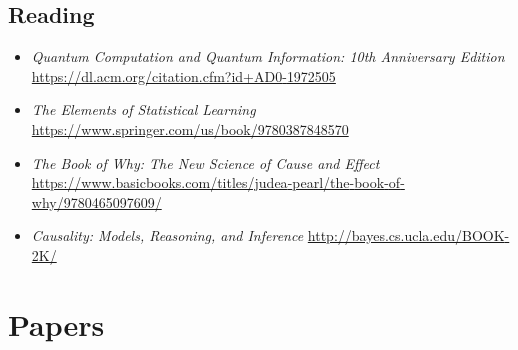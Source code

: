 \documentclass{article}%
\begin{document}
\subsection{Reading}%
\label{subsec:Reading}%
\begin{itemize}%
\item%
\textit{Quantum Computation and Quantum Information: 10th Anniversary Edition}%
\newline%
\href{https://dl.acm.org/citation.cfm?id+AD0{-}1972505}{https://dl.acm.org/citation.cfm?id+AD0{-}1972505}%
\item%
\textit{The Elements of Statistical Learning}%
\newline%
\href{https://www.springer.com/us/book/9780387848570}{https://www.springer.com/us/book/9780387848570}%
\item%
\textit{The Book of Why: The New Science of Cause and Effect}%
\newline%
\href{https://www.basicbooks.com/titles/judea{-}pearl/the{-}book{-}of{-}why/9780465097609/}{https://www.basicbooks.com/titles/judea{-}pearl/the{-}book{-}of{-}why/9780465097609/}%
\item%
\textit{Causality: Models, Reasoning, and Inference}%
\newline%
\href{http://bayes.cs.ucla.edu/BOOK{-}2K/}{http://bayes.cs.ucla.edu/BOOK{-}2K/}%
\end{itemize}

%
\section{Papers}%
\label{sec:Papers}%
\end{document}
